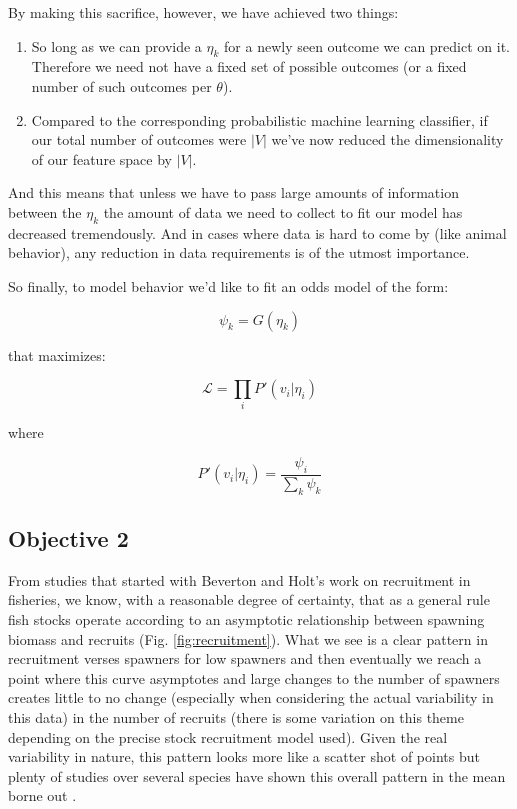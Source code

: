 \documentclass[11pt]{article}
\begin{document}
By making this sacrifice, however, we have achieved two things:

\begin{enumerate}
\item So long as we can provide a $\eta_k$ for a newly seen outcome we can predict on it. Therefore we need not have a fixed set of possible outcomes (or a fixed number of such outcomes per $\theta$).
\item Compared to the corresponding probabilistic machine learning classifier, if our total number of outcomes were $|V|$ we've now reduced the dimensionality of our feature space by $|V|$. 
\end{enumerate}

And this means that unless we have to pass large amounts of information between the $\eta_k$ the amount of data we need to collect to fit our model has decreased tremendously. And in cases where data is hard to come by (like animal behavior), any reduction in data requirements is of the utmost importance. 

So finally, to model behavior we'd like to fit an odds model of the form:

$$\psi_k = G(\eta_k)$$

that maximizes:

$$\mathcal{L}=\prod_i P'(v_i | \eta_i)$$

where 

$$P'(v_i|\eta_i) = \frac{\psi_i}{\sum_k \psi_k}$$\newline









\subsection{Objective 2}

From studies that started with Beverton and Holt's work on recruitment in fisheries, we know, with a reasonable degree of certainty, that as a general rule fish stocks operate according to an asymptotic relationship between spawning biomass and recruits \citep{waltersmartell} (Fig. \ref{fig:recruitment}). What we see is a clear pattern in recruitment verses spawners for low spawners and then eventually we reach a point where this curve asymptotes and large changes to the number of spawners creates little to no change (especially when considering the actual variability in this data) in the number of recruits (there is some variation on this theme depending on the precise stock recruitment model used). Given the real variability in nature, this pattern looks more like a scatter shot of points but plenty of studies over several species have shown this overall pattern in the mean borne out \citep{waltersmartell}. \newline
\end{document}

